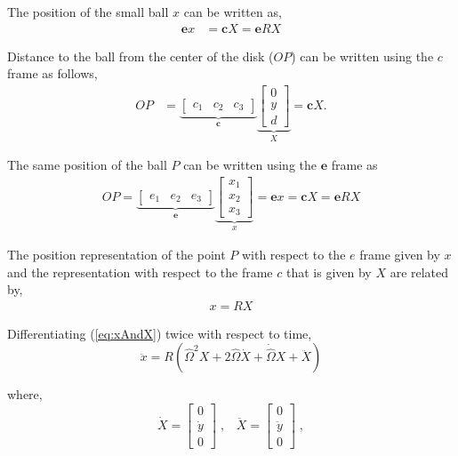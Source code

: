 \documentclass[graybox,envcountchap,sectrefs]{svmonoMuga}
\begin{document}
The position of the small ball $x$ can be written as,
\begin{align*}
\mathbf{e}x &= \mathbf{c}X= \mathbf{e}RX
\end{align*}

Distance to the ball from the center of the disk ($OP$) can be written using the $c$ frame as follows,
\begin{align*}
OP &= 
\underbrace{\begin{bmatrix}
c_1 & c_2 & c_3
\end{bmatrix}}_\mathbf{c}
\underbrace{
\begin{bmatrix}
0\\y\\d
\end{bmatrix}}_X=\mathbf{c}X.
\end{align*}

The same position of the ball $P$ can be written using the $\mathbf{e}$ frame as
\begin{align*}
OP=\underbrace{\begin{bmatrix}
e_1 & e_2 & e_3
\end{bmatrix}}_\mathbf{e}
\underbrace{
\begin{bmatrix}
x_1\\x_2\\x_3
\end{bmatrix}}_x=\mathbf{e}x=\mathbf{c}X=\mathbf{e}RX
\end{align*}


The position representation of the point $P$ with respect to the $e$ frame given by $x$ and the representation with respect to the frame $c$ that is given by $X$ are related by,
\begin{align}
x=RX\label{eq:xAndX}
\end{align}

Differentiating (\ref{eq:xAndX}) twice with respect to time,
\begin{equation}
\ddot{x}=R\left(\widehat{\Omega}^2X+2\widehat{\Omega}\dot{X}+\dot{\widehat{\Omega}}X+\ddot{X} \right)
\end{equation}

where,
\[ \dot{X}=\begin{bmatrix}
0\\\dot{y}\\0
\end{bmatrix} \;, \;\;\;
\ddot{X}=\begin{bmatrix}
0\\\ddot{y}\\0
\end{bmatrix} \;,
\]\\
\end{document}
